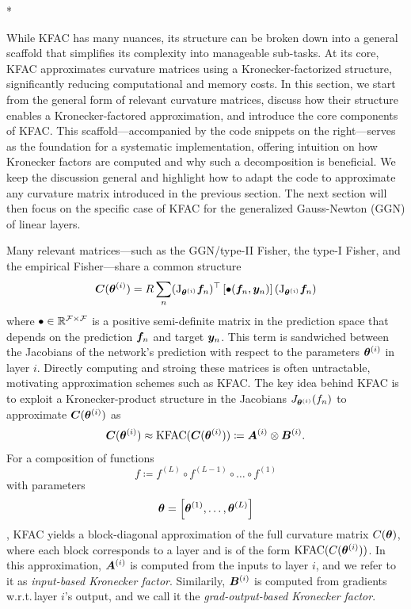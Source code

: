 \switchcolumn[1]*
\switchcolumn[0]

While KFAC has many nuances, its structure can be broken down into a general scaffold that simplifies its complexity into manageable sub-tasks.
At its core, KFAC approximates curvature matrices using a Kronecker-factorized structure, significantly reducing computational and memory costs. 
In this section, we start from the general form of relevant curvature matrices, discuss how their structure enables a Kronecker-factored approximation, and introduce the core components of KFAC. 
This scaffold---accompanied by the code snippets on the right---serves as the foundation for a systematic implementation, offering intuition on how Kronecker factors are computed and why such a decomposition is beneficial. 
We keep the discussion general and highlight how to adapt the code to approximate any curvature matrix introduced in the previous section.
The next section will then focus on the specific case of KFAC for the generalized Gauss-Newton (GGN) of linear layers.

Many relevant matrices---such as the GGN/type-II Fisher, the type-I Fisher, and the empirical Fisher---share a common structure
\begin{align*}
  {\bm{C}}({\bm{\theta}}^{(i)})
  = R \sum_n
  (\mathrm{J}_{{\bm{\theta}}^{(i)}} {\bm{f}}_n)^{\top}
  \left[ \bullet({\bm{f}}_n, {\bm{y}}_n) \right]
  (\mathrm{J}_{{\bm{\theta}}^{(i)}} {\bm{f}}_n)
\end{align*}
where $\bullet \in {\mathbb{R}}^{{\mathcal{F}} \times {\mathcal{F}}}$ is a positive semi-definite matrix in the prediction space that depends on the prediction ${\bm{f}}_n$ and target ${\bm{y}}_n$.
This term is sandwiched between the Jacobians of the network's prediction with respect to the parameters ${\bm{\theta}}^{(i)}$ in layer $i$. 
Directly computing and stroing these matrices is often untractable, motivating approximation schemes such as KFAC.
The key idea behind KFAC is to exploit a Kronecker-product structure in the Jacobians $J_{{\bm{\theta}}^{(i)}}(f_n)$ to approximate ${\bm{C}}({\bm{\theta}}^{(i)})$ as 
\begin{align*}
  {\bm{C}}({\bm{\theta}}^{(i)})
  \approx
  \mathrm{KFAC}({\bm{C}}({\bm{\theta}}^{(i)}))
  \coloneqq {\bm{A}}^{(i)} \otimes {\bm{B}}^{(i)}.
\end{align*}
For a composition of functions $$f \coloneqq f^{(L)} \circ f^{(L-1)} \circ \dots \circ f^{(1)}$$ with parameters $${\bm{\theta}} = \left[ {\bm{\theta}}^{(1)}, \dots, {\bm{\theta}}^{(L)} \right]$$, KFAC yields a block-diagonal approximation of the full curvature matrix $C({\bm{\theta}})$, where each block corresponds to a layer and is of the form $\mathrm{KFAC}(C({\bm{\theta}}^{(i)}))$. 
In this approximation, ${\bm{A}}^{(i)}$ is computed from the inputs to layer $i$, and we refer to it as \emph{input-based Kronecker factor}.
Similarily, ${\bm{B}}^{(i)}$ is computed from gradients w.r.t.\,layer $i$'s output, and we call it the \emph{grad-output-based Kronecker factor}.

